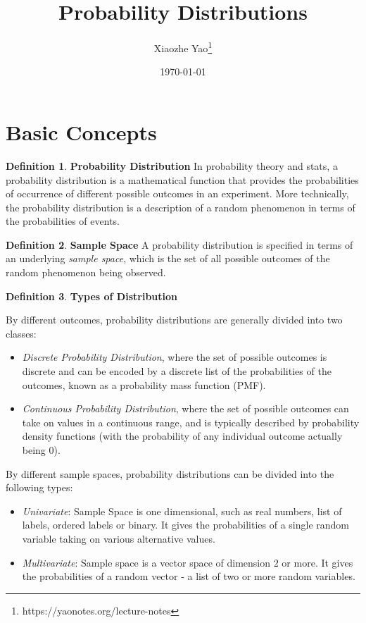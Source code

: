 \documentclass{article}
\title{Probability Distributions}
\author{Xiaozhe Yao\footnote{https://yaonotes.org/lecture-notes}}
\date{\today}
\theoremstyle{definition}
\newtheorem{defi}{Definition}[section]
\begin{document}
\maketitle

\section{Basic Concepts}

\begin{defi}
\textbf{Probability Distribution} In probability theory and stats, a probability distribution is a mathematical function that provides the probabilities of occurrence of different possible outcomes in an experiment. More technically, the probability distribution is a description of a random phenomenon in terms of the probabilities of events.
\end{defi}

\begin{defi}
\textbf{Sample Space} A probability distribution is specified in terms of an underlying \textit{sample space}, which is the set of all possible outcomes of the random phenomenon being observed. 
\end{defi}

\begin{defi}
\textbf{Types of Distribution} 

By different outcomes, probability distributions are generally divided into two classes:\begin{itemize}
    \item \textit{Discrete Probability Distribution}, where the set of possible outcomes is discrete and can be encoded by a discrete list of the probabilities of the outcomes, known as a probability mass function (PMF).
    \item \textit{Continuous Probability Distribution}, where the set of possible outcomes can take on values in a continuous range, and is typically described by probability density functions (with the probability of any individual outcome actually being 0).
\end{itemize} 

By different sample spaces, probability distributions can be divided into the following types:
\begin{itemize}
    \item \textit{Univariate}: Sample Space is one dimensional, such as real numbers, list of labels, ordered labels or binary. It gives the probabilities of a single random variable taking on various alternative values.
    \item \textit{Multivariate}: Sample space is a vector space of dimension $2$ or more. It gives the probabilities of a random vector - a list of two or more random variables.
\end{itemize}
\end{defi}
\end{document}
